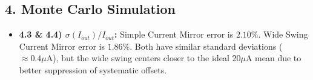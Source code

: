 \documentclass[12pt,a4paper]{article}
\begin{document}
\subsection*{4. Monte Carlo Simulation}
\begin{itemize}
    \item \textbf{4.3 \& 4.4) $\sigma(I_{out})/I_{out}$:} Simple Current Mirror error is $2.10\%$. Wide Swing Current Mirror error is $1.86\%$. Both have similar standard deviations ($\approx 0.4\mu\text{A}$), but the wide swing centers closer to the ideal $20\mu\text{A}$ mean due to better suppression of systematic offsets.
\end{itemize}
\end{document}

